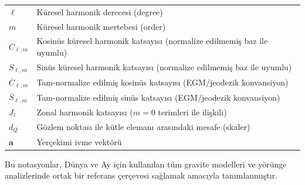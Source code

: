 \begin{longtable}{>{\raggedright\arraybackslash}p{3.2cm} p{10.8cm}}
$\ell$ & Küresel harmonik derecesi (degree) \\
$m$ & Küresel harmonik mertebesi (order) \\

$C_{\ell,m}$ & Kosinüs küresel harmonik katsayısı (normalize edilmemiş baz ile uyumlu) \\
$S_{\ell,m}$ & Sinüs küresel harmonik katsayısı (normalize edilmemiş baz ile uyumlu) \\
$\overline{C}_{\ell,m}$ & Tam-normalize edilmiş kosinüs katsayısı (EGM/jeodezik konvansiyon) \\
$\overline{S}_{\ell,m}$ & Tam-normalize edilmiş sinüs katsayısı (EGM/jeodezik konvansiyon) \\

$J_{\ell}$ & Zonal harmonik katsayısı ($m=0$ terimleri ile ilişkili) \\

$d_Q$ & Gözlem noktası ile kütle elemanı arasındaki mesafe (skaler) \\

$\mathbf{a}$ & Yerçekimi ivme vektörü \\

\end{longtable}

\vspace{0.2cm}

Bu notasyonlar, Dünya ve Ay için kullanılan tüm gravite modelleri ve yörünge
analizlerinde ortak bir referans çerçevesi sağlamak amacıyla tanımlanmıştır.
